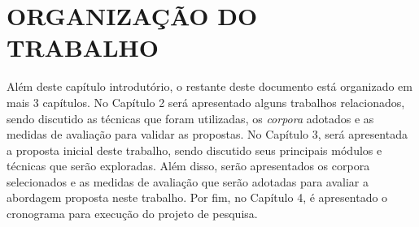 \section{ORGANIZAÇÃO DO TRABALHO}

Além deste capítulo introdutório, o restante deste documento está organizado em mais 3 capítulos. 
No Capítulo 2 será apresentado alguns trabalhos relacionados, sendo discutido as técnicas que foram utilizadas, os \textit{corpora} adotados e as medidas de avaliação para validar as propostas.
No Capítulo 3, será apresentada a proposta inicial deste trabalho, sendo discutido seus principais módulos e técnicas que serão exploradas.
Além disso, serão apresentados os corpora selecionados e as medidas de avaliação que serão adotadas para avaliar a abordagem proposta neste trabalho.
Por fim, no Capítulo 4, é apresentado o cronograma para execução do projeto de pesquisa.